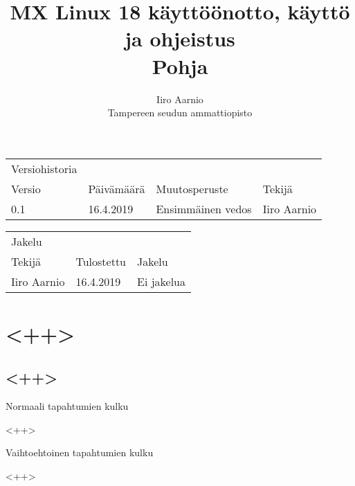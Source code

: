 \documentclass[a4paper, 12pt, finnish]{article}
\title{MX Linux 18 käyttöönotto, käyttö ja ohjeistus \\ \large Pohja} %
\author{Iiro Aarnio \\ Tampereen seudun ammattiopisto \\}
\begin{document}
\maketitle
\thispagestyle{empty} %

\newpage
\thispagestyle{empty}
\begin{table}[htpb]
	\begin{tabular}{llll}
		Versiohistoria &            &                         &             \\
		\rowcolor[HTML]{FFCCC9}
		Versio         & Päivämäärä & Muutosperuste           & Tekijä      \\
		0.1              & 16.4.2019   & Ensimmäinen vedos       & Iiro Aarnio \\
	\end{tabular}
\end{table}

\begin{table}[htpb]
	\begin{tabular}{lll}
		Jakelu &            &                                  \\
		\rowcolor[HTML]{FFCCC9}
		Tekijä         & Tulostettu & Jakelu                 \\
		Iiro Aarnio              & 16.4.2019   & Ei jakelua \\
	\end{tabular}
\end{table}

\newpage
\thispagestyle{empty} %

\tableofcontents

\newpage
{} %

\setcounter{page}{1} %
\newpage
\section{<++>}

\subsection{<++>}

Normaali tapahtumien kulku

\begin{adjustwidth}{0.4\textwidth}{}
        <++>
\end{adjustwidth}
Vaihtoehtoinen tapahtumien kulku

\begin{adjustwidth}{0.4\textwidth}{}
        <++>
\end{adjustwidth}
\end{document}
